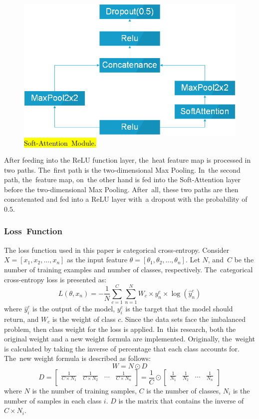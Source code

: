 \documentclass[sensors,article,accept,pdftex,moreauthors]{Definitions/mdpi}
\begin{document}
\begin{figure}[H]
	\includegraphics[width=0.5\linewidth]{Definitions/SoftAttentionBlock}
	\caption{\hl{Soft-Attention~Module.} %
}
	\label{fig:soft-attention-block}
\end{figure}

After feeding into the ReLU function layer, the~heat feature map is processed in two paths. The~first path is the two-dimensional Max Pooling. In~the second path, the~feature map, on~the other hand is fed into the Soft-Attention layer before the two-dimensional Max Pooling. After~all, these two paths are then concatenated and fed into a ReLU layer with~a dropout with the probability of $0.5$.


\subsubsection{Loss~Function}
The loss function used in this paper is categorical cross-entropy. Consider $X = [x_1, x_2, \dots, x_n]$ as the input feature $\theta = [\theta_1, \theta_2, \dots, \theta_n]$. Let $N$, and~$C$ be the number of training examples and number of classes, respectively. The~categorical cross-entropy loss is presented as:
\[L(\theta, x_n) = -\frac{1}{N}\sum_{c=1}^{C}\sum_{n=1}^{N}W_c\times y^c_n \times \log(\hat{y}^c_n)\]
where $\hat{y}^c_i$  is the output of the model, $y^c_i$ is the target that the model should return, and $W_c$ is the weight of class $c$. Since the data sets face the imbalanced problem, then class weight for the loss is applied. In~this research, both the original weight and a new weight formula are implemented. Originally, the~weight is calculated by taking the inverse of percentage that each class accounts for. The~new weight formula is described as follows:
\[W = N \odot D\]
\[D = \begin{bmatrix}
	\frac{1}{C \times  N_1} & \frac{1}{C \times  N_2} & \dots & \frac{1}{C \times  N_n}\\
\end{bmatrix} = \frac{1}{C} \odot \begin{bmatrix}
	\frac{1}{N_1} & \frac{1}{N_2} & \dots & \frac{1}{N_n}\\
\end{bmatrix}\]
where $N$ is the number of training samples, $C$ is the number of classes, $N_i$ is the number of samples in each class $i$. $D$ is the matrix that contains the inverse of $C \times N_i$. 
\end{document}

